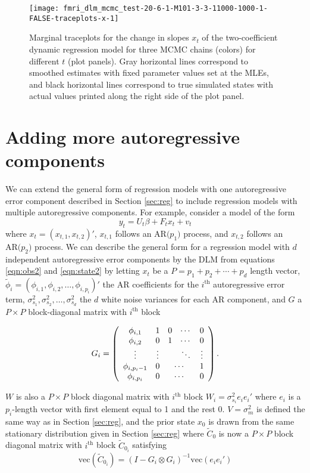 \documentclass{article}
\begin{document}
\begin{figure}[ht]
\texttt{[image: fmri\_dlm\_mcmc\_test-20-6-1-M101-3-3-11000-1000-1-FALSE-traceplots-x-1]}
\caption{Marginal traceplots for the change in slopes $x_t$ of the two-coefficient dynamic regression model for three MCMC chains (colors) for different $t$ (plot panels). Gray horizontal lines correspond to smoothed estimates with fixed parameter values set at the MLEs, and black horizontal lines correspond to true simulated states with actual values printed along the right side of the plot panel.} \label{fig:tracex-drext}
\end{figure}

\clearpage

\section{Adding more autoregressive components} \label{sec:add}

We can extend the general form of regression models with one autoregressive error component described in Section \ref{sec:reg} to include regression models with multiple autoregressive components. For example, consider a model of the form \[y_t = U_t\beta + F_tx_t + v_t\] where $x_t = (x_{t,1},x_{t,2})'$, $x_{t,1}$ follows an $\mbox{AR(}p_1\mbox{)}$ process, and $x_{t,2}$ follows an $\mbox{AR(}p_2\mbox{)}$ process. We can describe the general form for a regression model with $d$ independent autoregressive error components by the DLM from equations \eqref{eqn:obs2} and \eqref{eqn:state2} by letting $x_t$ be a $P = p_1 + p_2 + \cdots + p_d$ length vector, $\tilde{\phi}_i = (\phi_{i,1},\phi_{i,2},\ldots,\phi_{i,p_i})'$ the AR coefficients for the $i^{\mbox{th}}$ autoregressive error term, $\sigma^2_{s_1}, \sigma^2_{s_2}, \ldots, \sigma^2_{s_d}$ the $d$ white noise variances for each AR component, and $G$ a $P \times P$ block-diagonal matrix with $i^{\mbox{th}}$ block

\[G_i = \left(
\begin{array}{ccccc}
\phi_{i,1} & 1 & 0 & \cdots & 0 \\
\phi_{i,2} & 0 & 1 & \cdots & 0 \\
\vdots & \vdots & & \ddots & \vdots \\
\phi_{i,p_i-1} & 0 & \multicolumn{2}{c}{\cdots} & 1 \\
\phi_{i,p_i} & 0 & \multicolumn{2}{c}{\cdots} & 0
\end{array}
\right).\]

\noindent $W$ is also a $P\times P$ block diagonal matrix with $i^{\mbox{th}}$ block $W_i = \sigma^2_{s_i}e_ie_i'$ where $e_i$ is a $p_i$-length vector with first element equal to 1 and the rest 0. $V = \sigma^2_m$ is defined the same way as in Section  \ref{sec:reg}, and the prior state $x_0$ is drawn from the same stationary distribution given in Section \ref{sec:reg} where $\tilde{C}_0$ is now a $P\times P$ block diagonal matrix with $i^{\mbox{th}}$ block $\tilde{C}_{0_i}$ satisfying \[\mbox{vec}(\tilde{C}_{0_i}) = (I - G_i \otimes G_i)^{-1}\mbox{vec}(e_ie_i')\]
\end{document}
